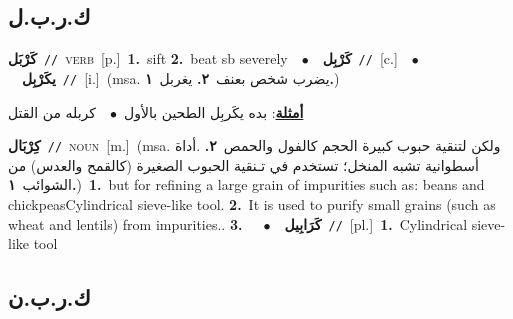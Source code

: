 \documentclass[10pt,a4paper,twoside]{article} %
\begin{document}
\begin{multicols}{2}
\vspace{-3mm}
\subsection*{\color{blue}\foreignlanguage{arabic}{ك.ر.ب.ل}\color{blue}{}} 

{\setlength\topsep{0pt}\textbf{\foreignlanguage{arabic}{كَرْبَل}}\ {\color{gray}\texttt{//}\color{black}}\ \textsc{verb}\ [p.]\ \textbf{1.}~sift  \textbf{2.}~beat sb severely\ \ $\bullet$\ \ \setlength\topsep{0pt}\textbf{\foreignlanguage{arabic}{كَرْبِل}}\ {\color{gray}\texttt{//}\color{black}}\ [c.]\ \ $\bullet$\ \ \setlength\topsep{0pt}\textbf{\foreignlanguage{arabic}{يكَرْبِل}}\ {\color{gray}\texttt{//}\color{black}}\ [i.]\ \color{gray}(msa. \foreignlanguage{arabic}{يضرب شخص بعنف}~\foreignlanguage{arabic}{\textbf{٢.}}  \foreignlanguage{arabic}{يغربل}~\foreignlanguage{arabic}{\textbf{١.}})\color{black}\  \begin{flushright}\color{gray}\foreignlanguage{arabic}{\textbf{\underline{\foreignlanguage{arabic}{أمثلة}}}: بده يكَربِل الطحين بالأول\ $\bullet$\ \  كربله من القتل}\end{flushright}\color{black}} \vspace{2mm}

{\setlength\topsep{0pt}\textbf{\foreignlanguage{arabic}{كِرْبَال}}\ {\color{gray}\texttt{//}\color{black}}\ \textsc{noun}\ [m.]\ \color{gray}(msa. \foreignlanguage{arabic}{ولكن لتنقية حبوب كبيرة الحجم كالفول والحمص}~\foreignlanguage{arabic}{\textbf{٢.}}  .\foreignlanguage{arabic}{أداة أسطوانية تشبه المنخل؛ تستخدم في تـنقية الحبوب الصغيرة (كالقمح والعدس) من الشوائب}~\foreignlanguage{arabic}{\textbf{١.}})\color{black}\ \textbf{1.}~but for refining a large grain of impurities such as: beans and chickpeasCylindrical sieve-like tool.  \textbf{2.}~It is used to purify small grains (such as wheat and lentils) from impurities..  \textbf{3.}~\ \ $\bullet$\ \ \setlength\topsep{0pt}\textbf{\foreignlanguage{arabic}{كَرَابِيل}}\ {\color{gray}\texttt{//}\color{black}}\ [pl.]\ \textbf{1.}~Cylindrical sieve-like tool\ } \vspace{2mm}

\vspace{-3mm}
\subsection*{\color{blue}\foreignlanguage{arabic}{ك.ر.ب.ن}\color{blue}{ (ntws)}} 


\end{multicols}
\end{document}
